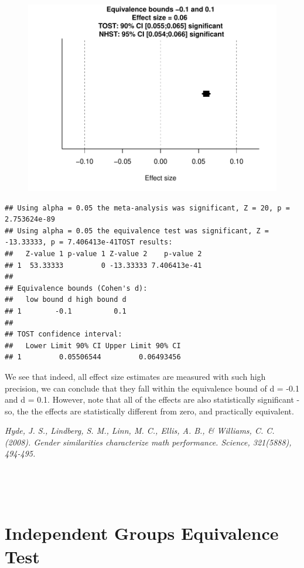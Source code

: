 \documentclass[english,man]{apa6}
\theoremstyle{definition}
\theoremstyle{definition}
\theoremstyle{definition}
\theoremstyle{remark}
\begin{document}
\begin{figure}[htbp]
\centering
\includegraphics{manuscript_files/figure-latex/unnamed-chunk-5-1.pdf}
\caption{}
\end{figure}

\begin{verbatim}
## Using alpha = 0.05 the meta-analysis was significant, Z = 20, p = 2.753624e-89
## Using alpha = 0.05 the equivalence test was significant, Z = -13.33333, p = 7.406413e-41TOST results:
##   Z-value 1 p-value 1 Z-value 2    p-value 2
## 1  53.33333         0 -13.33333 7.406413e-41
## 
## Equivalence bounds (Cohen's d):
##   low bound d high bound d
## 1        -0.1          0.1
## 
## TOST confidence interval:
##   Lower Limit 90% CI Upper Limit 90% CI
## 1         0.05506544         0.06493456
\end{verbatim}

We see that indeed, all effect size estimates are measured with such
high precision, we can conclude that they fall within the equivalence
bound of d = -0.1 and d = 0.1. However, note that all of the effects are
also statistically significant - so, the the effects are statistically
different from zero, and practically equivalent.

\emph{Hyde, J. S., Lindberg, S. M., Linn, M. C., Ellis, A. B., \&
Williams, C. C. (2008). Gender similarities characterize math
performance. Science, 321(5888), 494-495.}

~

~

\section{Independent Groups Equivalence
Test}\label{independent-groups-equivalence-test}
\end{document}
